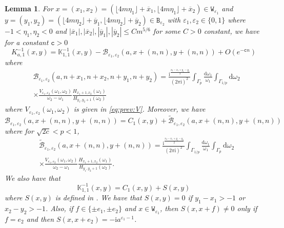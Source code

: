 \documentclass[11pt,twoside]{amsart}
\theoremstyle{plain}
\newtheorem{lem}[thm]{Lemma}
\numberwithin{quest}{section}
\theoremstyle{remark}
\numberwithin{rem}{section}
\theoremstyle{definition}
\newcommand{\eps}{\varepsilon}
\begin{document}
	\begin{lem}\label{lem:switchcontoursBtilde}
		For $x=(x_1,x_2)=(\lfloor 4m\eta_1 \rfloor +\overline{x}_1,\lfloor 4m\eta_1 \rfloor+\overline{x}_2)\in \mathtt{W}_{\eps_1}$ and $y=(y_1,y_2)=(\lfloor 4m\eta_2 \rfloor+\overline{y}_1,\lfloor 4m\eta_2 \rfloor +\overline{y}_2)\in \mathtt{B}_{\eps_2}$ with $\eps_1,\eps_2 \in\{0,1\}$ where $-1<\eta_1,\eta_2<0$ and $|\overline{x}_1|,|\overline{x}_2|,|\overline{y}_1|,|\overline{y}_2|  \le C m^{5/6}$ for some $C>0$ constant, we have for a constant $\mathtt{c}>0$
		\begin{equation}
        \label{E:first-eq-10.3}
			K^{-1}_{a,1}(x,y)=\mathbb{K}^{-1}_{1,1}(x,y)-\mathcal{B}_{\eps_1,\eps_2}(a,x+(n,n),y+(n,n))+O(e^{-\mathtt{c}n})
		\end{equation}
		where
		\begin{equation}\label{eq:prev:B}
			\begin{split}
				&\mathcal{B}_{\eps_1,\eps_2}(a,n+x_1,n+x_2,n+y_1,n+y_2)=\frac{\mathrm{i}^{\frac{x_2-x_1+y_1-y_2}{2}}}{(2\pi \mathrm{i})^2} \int_{\Gamma_p} \frac{\mathrm{d}\omega_1}{\omega_1} \int_{\Gamma_{1/p}} \mathrm{d}\omega_2 \\
				&\times \frac{V_{\eps_1,\eps_2}(\omega_1,\omega_2)}{\omega_2 - \omega_1} \frac{ H_{x_1+1,x_2}(\omega_1)}{H_{y_1,y_2+1}(\omega_2)}
			\end{split}
		\end{equation}
		where $V_{\eps_1,\eps_2}(\omega_1,\omega_2)$ is given in \eqref{eq:prev:V}. Moreover, we have
		\begin{equation} \label{eq:lem:switchcontours}
			\mathcal{B}_{\eps_1,\eps_2}(a,x+(n,n),y+(n,n))=C_1(x,y)+\tilde{\mathcal{B}}_{\eps_1,\eps_2}(a,x+(n,n),y+(n,n))
		\end{equation}
		where for $\sqrt{2c}<p<1$,
		\begin{equation*}
			\begin{split}\label{eq:prev:Btilde}
				&\tilde{\mathcal{B}}_{\eps_1,\eps_2}(a,x+(n,n),y+(n,n))=\frac{\mathrm{i}^{\frac{x_2-x_1+y_1-y_2}{2}}}{(2\pi \mathrm{i})^2} \int_{\Gamma_{1/p}} \frac{\mathrm{d}\omega_1}{\omega_1} \int_{\Gamma_{p}} \mathrm{d}\omega_2 \\
				&\times \frac{V_{\eps_1,\eps_2}(\omega_1,\omega_2)}{\omega_2 - \omega_1} \frac{ H_{x_1+1,x_2}(\omega_1)}{H_{y_1,y_2+1}(\omega_2)}.
			\end{split}
		\end{equation*}
		We also have that 
		\begin{equation}
        \label{E:KCS}
			\mathbb{K}^{-1}_{1,1}(x,y)=C_1(x,y)+S(x,y)
		\end{equation}
		where $S(x,y)$ is defined in \cite[Equation (2.18)]{CJ16}.  We have that $S(x,y)=0$ if $y_1-x_1>-1$ or $x_2-y_2>-1$. Also, if $f \in \{\pm e_1,\pm e_2\}$ and $x \in \mathtt{W}_{\eps_1}$, then $S(x,x+f)\not=0$ only if $f=e_2$ and then $S(x,x+e_2)=-\mathrm{i}a^{\eps_1-1}$.  
		
	\end{lem}
	
\end{document}
